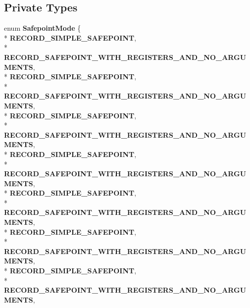 \subsection*{Private Types}
\begin{DoxyCompactItemize}
\item 
enum {\bfseries Safepoint\+Mode} \{ \\*
{\bfseries R\+E\+C\+O\+R\+D\+\_\+\+S\+I\+M\+P\+L\+E\+\_\+\+S\+A\+F\+E\+P\+O\+I\+NT}, 
\\*
{\bfseries R\+E\+C\+O\+R\+D\+\_\+\+S\+A\+F\+E\+P\+O\+I\+N\+T\+\_\+\+W\+I\+T\+H\+\_\+\+R\+E\+G\+I\+S\+T\+E\+R\+S\+\_\+\+A\+N\+D\+\_\+\+N\+O\+\_\+\+A\+R\+G\+U\+M\+E\+N\+TS}, 
\\*
{\bfseries R\+E\+C\+O\+R\+D\+\_\+\+S\+I\+M\+P\+L\+E\+\_\+\+S\+A\+F\+E\+P\+O\+I\+NT}, 
\\*
{\bfseries R\+E\+C\+O\+R\+D\+\_\+\+S\+A\+F\+E\+P\+O\+I\+N\+T\+\_\+\+W\+I\+T\+H\+\_\+\+R\+E\+G\+I\+S\+T\+E\+R\+S\+\_\+\+A\+N\+D\+\_\+\+N\+O\+\_\+\+A\+R\+G\+U\+M\+E\+N\+TS}, 
\\*
{\bfseries R\+E\+C\+O\+R\+D\+\_\+\+S\+I\+M\+P\+L\+E\+\_\+\+S\+A\+F\+E\+P\+O\+I\+NT}, 
\\*
{\bfseries R\+E\+C\+O\+R\+D\+\_\+\+S\+A\+F\+E\+P\+O\+I\+N\+T\+\_\+\+W\+I\+T\+H\+\_\+\+R\+E\+G\+I\+S\+T\+E\+R\+S\+\_\+\+A\+N\+D\+\_\+\+N\+O\+\_\+\+A\+R\+G\+U\+M\+E\+N\+TS}, 
\\*
{\bfseries R\+E\+C\+O\+R\+D\+\_\+\+S\+I\+M\+P\+L\+E\+\_\+\+S\+A\+F\+E\+P\+O\+I\+NT}, 
\\*
{\bfseries R\+E\+C\+O\+R\+D\+\_\+\+S\+A\+F\+E\+P\+O\+I\+N\+T\+\_\+\+W\+I\+T\+H\+\_\+\+R\+E\+G\+I\+S\+T\+E\+R\+S\+\_\+\+A\+N\+D\+\_\+\+N\+O\+\_\+\+A\+R\+G\+U\+M\+E\+N\+TS}, 
\\*
{\bfseries R\+E\+C\+O\+R\+D\+\_\+\+S\+I\+M\+P\+L\+E\+\_\+\+S\+A\+F\+E\+P\+O\+I\+NT}, 
\\*
{\bfseries R\+E\+C\+O\+R\+D\+\_\+\+S\+A\+F\+E\+P\+O\+I\+N\+T\+\_\+\+W\+I\+T\+H\+\_\+\+R\+E\+G\+I\+S\+T\+E\+R\+S\+\_\+\+A\+N\+D\+\_\+\+N\+O\+\_\+\+A\+R\+G\+U\+M\+E\+N\+TS}, 
\\*
{\bfseries R\+E\+C\+O\+R\+D\+\_\+\+S\+I\+M\+P\+L\+E\+\_\+\+S\+A\+F\+E\+P\+O\+I\+NT}, 
\\*
{\bfseries R\+E\+C\+O\+R\+D\+\_\+\+S\+A\+F\+E\+P\+O\+I\+N\+T\+\_\+\+W\+I\+T\+H\+\_\+\+R\+E\+G\+I\+S\+T\+E\+R\+S\+\_\+\+A\+N\+D\+\_\+\+N\+O\+\_\+\+A\+R\+G\+U\+M\+E\+N\+TS}, 
\\*
{\bfseries R\+E\+C\+O\+R\+D\+\_\+\+S\+I\+M\+P\+L\+E\+\_\+\+S\+A\+F\+E\+P\+O\+I\+NT}, 
\\*
{\bfseries R\+E\+C\+O\+R\+D\+\_\+\+S\+A\+F\+E\+P\+O\+I\+N\+T\+\_\+\+W\+I\+T\+H\+\_\+\+R\+E\+G\+I\+S\+T\+E\+R\+S\+\_\+\+A\+N\+D\+\_\+\+N\+O\+\_\+\+A\+R\+G\+U\+M\+E\+N\+TS}, 

\end{DoxyCompactItemize}
